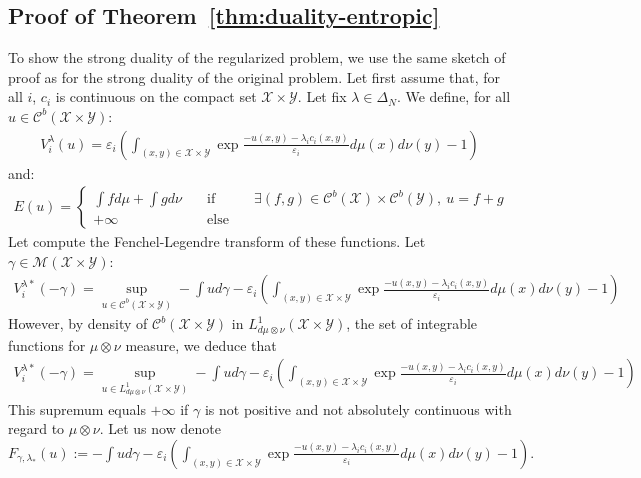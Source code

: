 \subsection{Proof of Theorem~\ref{thm:duality-entropic}}


\begin{prv*}
To show the strong duality of the regularized problem, we use the same sketch of proof as for the strong duality of the original problem. 
\medskip
Let first assume that, for all $i$, $c_i$ is continuous on the compact set $\mathcal{X}\times\mathcal{Y}$. Let fix $\lambda\in\Delta_N$. We define, for all $u\in\mathcal{C}^b(\mathcal{X}\times\mathcal{Y})$:
\begin{align*}
    V^\lambda_i(u) = \varepsilon_i\left(\int_{(x,y)\in\mathcal{X}\times\mathcal{Y}} \exp{\frac{-u(x,y)-\lambda_ic_i(x,y)}{\varepsilon_i}}d\mu(x)d\nu(y)-1\right)
\end{align*}
and:
\begin{align*}
E(u)=\left\{\begin{matrix} \int fd\mu+\int gd\nu &\quad\text{if}\quad& \exists (f,g)\in \mathcal{C}^b(\mathcal{X})\times\mathcal{C}^b(\mathcal{Y}),~ u = f+g\\
+\infty &\quad\text{else}\quad&\end{matrix}\right.
\end{align*}
Let compute the Fenchel-Legendre transform of these functions. Let $\gamma\in\mathcal{M}(\mathcal{X}\times\mathcal{Y})$:
\begin{align*}
    V^{\lambda*}_i(-\gamma) = \sup_{u\in\mathcal{C}^b(\mathcal{X}\times\mathcal{Y})}-\int ud\gamma -\varepsilon_i\left(\int_{(x,y)\in\mathcal{X}\times\mathcal{Y}} \exp{\frac{-u(x,y)-\lambda_ic_i(x,y)}{\varepsilon_i}}d\mu(x)d\nu(y)-1\right) 
\end{align*}
However, by density of $\mathcal{C}^b(\mathcal{X}\times\mathcal{Y})$ in $L^1_{d\mu\otimes\nu}(\mathcal{X}\times\mathcal{Y})$, the set of integrable functions for $\mu\otimes\nu$ measure, we deduce that
\begin{align*}
    V^{\lambda*}_i(-\gamma) = \sup_{u\in L^1_{d\mu\otimes\nu}(\mathcal{X}\times\mathcal{Y})}-\int ud\gamma -\varepsilon_i\left(\int_{(x,y)\in\mathcal{X}\times\mathcal{Y}} \exp{\frac{-u(x,y)-\lambda_ic_i(x,y)}{\varepsilon_i}}d\mu(x)d\nu(y)-1\right) 
\end{align*}
This supremum equals $+\infty$ if $\gamma$ is not positive and not absolutely continuous with regard to $\mu\otimes \nu$. Let us now denote 
$F_{\gamma,\lambda_*}(u):=-\int ud\gamma -\varepsilon_i\left(\int_{(x,y)\in\mathcal{X}\times\mathcal{Y}} \exp{\frac{-u(x,y)-\lambda_ic_i(x,y)}{\varepsilon_i}}d\mu(x)d\nu(y)-1\right).$

\end{prv*}
